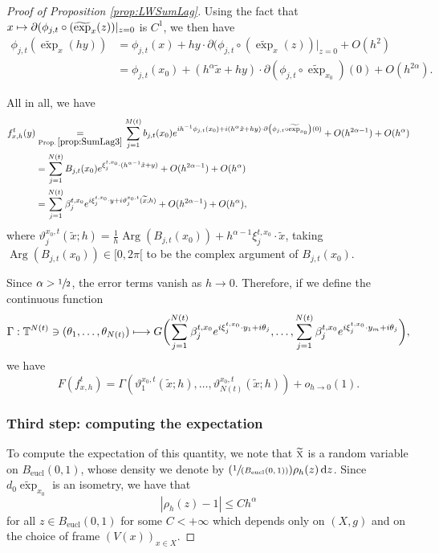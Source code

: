 \documentclass[JEP,XML,SOM,Unicode,published]{cedram}
\newcommand{\NoChangel}[1]{%
\expandafter\let\csname old\string#1\endcsname=#1
\let#1=\relax
\newcommand{#1}{\mathcode`l="716C\csname old\string#1\endcsname\mathcode`l="7160 }%
}
\newcommand\mto{\mathchoice{\longmapsto}{\mapsto}{\mapsto}{\mapsto}}
\newcommand{\Psfrac}[2]{(\sfrac{#1}{#2})}
\newcommand{\rd}{\,\mathrm{d}}
\newcommand{\eucl}{\mathrm{eucl}}
\DeclareMathOperator{\Arg}{Arg}
\theoremstyle{plain}
\theoremstyle{definition}
\DeclareMathOperator{\Vol}{Vol}\NoChangel{\Vol}
\begin{document}
\begin{proof}[Proof of Proposition \ref{prop:LWSumLag}]
Using the fact that $x\mto \partial (\phi_{j,t}\circ(\widetilde{\exp}_{x}(z))|_{z=0}$ is $C^1$, we then have
\begin{align*}
\phi_{j,t}(\widetilde{\exp}_x(hy)) &= \phi_{j,t}(x) + hy \cdot \partial (\phi_{j,t}\circ(\widetilde{\exp}_x(z))|_{z=0}+ O(h^2)\\
&=\phi_{j,t}(x_0) + (h^\alpha \tilde{x}+ hy) \cdot \partial \left(\phi_{j,t}\circ \widetilde{\exp}_{x_0} \right)(0) + O(h^{2\alpha}).
\end{align*}

All in all, we have
\begin{align*}
f_{x, h}^t(y) &\underset{\textup{Prop.\,}\ref{prop:SumLag3}}{=}\sum_{j=1}^{M(t)} b_{j,t}(x_0) e^{i h^{-1}\phi_{j,t}(x_0) +i(h^\alpha \tilde{x}+ hy) \cdot \partial \left(\phi_{j,t}\circ \widetilde{\exp}_{x_0} \right)(0)} + O(h^{2\alpha - 1}) +O(h^\alpha)\\
&=\sum_{j=1}^{N(t)} B_{j,t}(x_0)e^{ \xi_j^{t,x_0} \cdot (h^{\alpha-1} \tilde{x}+ y)}+O(h^{2\alpha-1})+O(h^\alpha)\,\\
&=\sum_{j=1}^{N(t)}\beta_j^{t,x_0}e^{i\xi_j^{t,x_0}\cdot y+i\vartheta_j^{x_0,t}(\widetilde{x}; h)}+O(h^{2\alpha-1})+O(h^\alpha),
\end{align*}
where $\vartheta_j^{x_0,t}(\widetilde{x}; h)= \frac{1}{h} \Arg(B_{j,t}(x_0)) +h^{\alpha-1}\xi_j^{t,x_0}\cdot\widetilde{x}$, taking $\Arg(B_{j,t}(x_0))\in [0, 2\pi[$ to be the complex argument of $B_{j,t}(x_0)$.

Since $\alpha>\sfrac{1}{2}$, the error terms vanish as $h\to 0$. Therefore, if we define the continuous function
\[
\Gamma : \mathbb{T}^{N(t)} \ni (\theta_1,\dots,\theta_{N(t)}) \mto G \biggl(\sum_{j=1}^{N(t)}\beta_j^{t,x_0} e^{i\xi_j^{t,x_0}\cdot y_1+i\theta_j}, \dots, \sum_{j=1}^{N(t)}\beta_j^{t,x_0} e^{i\xi_j^{t,x_0}\cdot y_m+i\theta_j} \biggr),
\]
we have
\begin{equation}\label{eq:fixed_frame_local_limits_2}
F(f^t_{x,h})= \Gamma(\vartheta_1^{x_0,t}(\widetilde{x}; h),\dots,\vartheta_{N(t)}^{x_0,t}(\widetilde{x}; h)) +o_{h\to 0}(1).
\end{equation}

\subsubsection*{Third step: computing the expectation}
To compute the expectation of this quantity, we note that $\widetilde{\textsc{x}}$ is a random variable on $B_{\eucl}(0,1)$, whose density we denote by $\Psfrac{1}{\Vol(B_{\eucl}(0,1))}\rho_h(z)\rd z$. Since $d_0\widetilde{\exp}_{x_0}$ is an isometry, we have that
\begin{equation}\label{eq:fixed_frame_local_limits_1}
|\rho_h(z)-1|\leq C h^\alpha
\end{equation}
for all $z\in B_{\eucl}(0,1)$ for some $C<+\infty$ which depends only on $(X,g)$ and on the choice of frame $(V(x))_{x\in X}$.


\end{proof}
\end{document}
